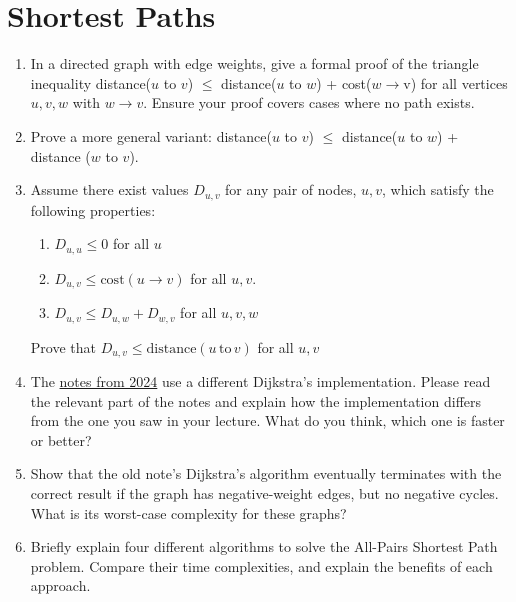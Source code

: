 \documentclass{article}
\begin{document}
\section{Shortest Paths}

\begin{enumerate}
    \item In a directed graph with edge weights, give a formal proof of the triangle inequality
distance($u$ to $v$) $\leq$ distance($u$ to $w$) + cost($w \rightarrow $v) for all vertices $u,v,w$ with $w \rightarrow v$.
Ensure your proof covers cases where no path exists.
\item Prove a more general variant: distance($u$ to $v$) $\leq$ distance($u$ to $w$) + distance ($w$ to $v$).

\item Assume there exist values $D_{u,v}$ for any pair of nodes, $u,v$, which satisfy the following properties:
\begin{enumerate}
    \item $D_{u,u}\leq 0$ for all $u$
    \item $D_{u,v}\leq \mathrm{cost}(u\rightarrow v)$ for all $u,v$.
    \item $D_{u,v}\leq D_{u,w} + D_{w,v}$ for all $u,v,w$
\end{enumerate}

Prove that $D_{u,v} \leq \mathrm{distance}(u\,\mathrm{to}\,v )$ for all $u,v$

\item The \href{https://www.cl.cam.ac.uk/teaching/2324/Algorithm1/content/algorithms2.pdf}{notes from 2024} use a different Dijkstra's implementation. Please read the relevant part of the notes and explain how the implementation differs from the one you saw in your lecture. What do you think, which one is faster or better?

\item Show that the old note's Dijkstra's algorithm eventually terminates with the correct result if the graph has negative-weight edges, but no negative cycles. What is its worst-case complexity for these graphs?

\item Briefly explain four different algorithms to solve the All-Pairs Shortest Path problem. Compare their time complexities, and explain the benefits of each approach.
\end{enumerate}
\end{document}
